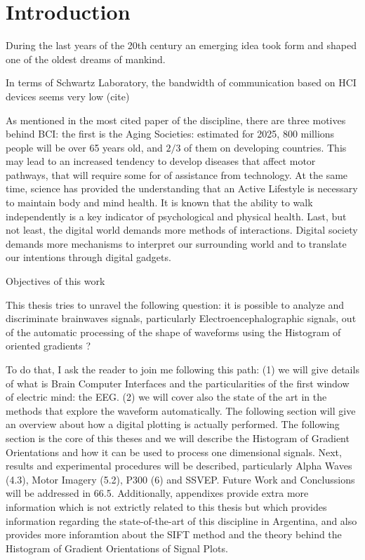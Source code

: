 \chapter*{Introduction}

During the last years of the 20th century an emerging idea took form and shaped one of the oldest dreams of mankind.

In terms of Schwartz Laboratory, the bandwidth of communication based on HCI devices seems very low (cite)

As mentioned in the most cited paper of the discipline, there are three motives behind BCI: the first is the Aging Societies: estimated for 2025, 800 millions people will be over 65 years old, and $2/3$ of them on developing countries.  This may lead to an increased tendency to develop diseases that affect motor pathways, that will require some for of assistance from technology. At the same time, science has provided the understanding that an Active Lifestyle is necessary to maintain body and mind health.  It is known that the ability to walk independently is a key indicator of psychological and physical health.   Last, but not least, the digital world demands more methods of interactions.  Digital society demands more mechanisms to interpret our surrounding  world and to translate our intentions through digital gadgets.

Objectives of this work

This thesis tries to unravel the following question:  it is possible to analyze and discriminate brainwaves signals, particularly Electroencephalographic signals, out of the automatic processing of the shape of waveforms using the Histogram of oriented gradients ?

To do that, I ask the reader to join me following this path:  (1) we will give details of what is Brain Computer Interfaces and the particularities of the first window of electric mind: the EEG.  (2)  we will cover also the state of the art in the methods that explore the waveform automatically.  The following section will give an overview about how a digital plotting is actually performed. The following section is the core of this theses and we will describe the Histogram of Gradient Orientations and how it can be used to process one dimensional signals.
Next, results and experimental procedures will be described, particularly Alpha Waves (4.3), Motor Imagery (5.2), P300 (6) and SSVEP.  Future Work and Conclussions will be addressed in 66.5.  Additionally, appendixes provide extra more information which is not extrictly related to this thesis but which provides information regarding the state-of-the-art of this discipline in Argentina, and also provides more inforamtion about the SIFT method and the theory behind the Histogram of Gradient Orientations of Signal Plots.


